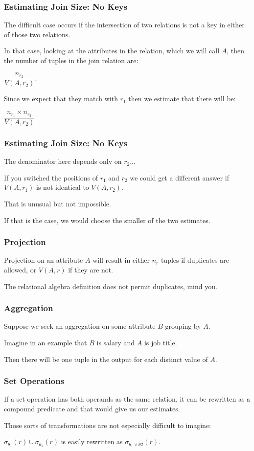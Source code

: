 \begin{frame}
\frametitle{Estimating Join Size: No Keys}

The difficult case occurs if the intersection of two relations is not a key in either of those two relations. 

In that case, looking at the attributes in the relation, which we will call $A$, then the number of tuples in the join relation are:

$\dfrac{n_{r_{2}}}{ V(A, r_{2})} $. 

Since we expect that they match with $r_{1}$ then we estimate that there will be:

$\dfrac{n_{r_{1}} \times n_{r_{2}}}{ V(A, r_{2})} $. 

\end{frame}

\begin{frame}
\frametitle{Estimating Join Size: No Keys}

The denominator here depends only on $r_{2}$...  

If you switched the positions of $r_{1}$ and $r_{2}$ we could get a different answer if $V(A, r_{1})$ is not identical to $V(A, r_{2})$. 

That is unusual but not impossible. 

If that is the case, we would choose the smaller of the two estimates.

\end{frame}

\begin{frame}
\frametitle{Projection}

Projection on an attribute $A$ will result in either $n_{r}$ tuples if duplicates are allowed, or $V(A, r)$ if they are not. 

The relational algebra definition does not permit duplicates, mind you.

\end{frame}

\begin{frame}
\frametitle{Aggregation}

Suppose we seek an aggregation on some attribute $B$ grouping by $A$.

 Imagine in an example that $B$ is salary and $A$ is job title. 
 
 Then there will be one tuple in the output for each distinct value of $A$.

\end{frame}

\begin{frame}
\frametitle{Set Operations}
If a set operation has both operands as the same relation, it can be rewritten as a compound predicate and that would give us our estimates. 

Those sorts of transformations are not especially difficult to imagine: 

$\sigma_{\theta_{1}}(r) \cup \sigma_{\theta_{2}}(r)$ is easily rewritten as $\sigma_{\theta_{1} \vee \theta{2}}(r)$. 


\end{frame}

